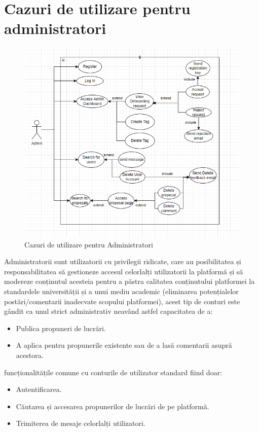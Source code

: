 \documentclass[12pt,a4paper,hidelinks]{report}
\theoremstyle{definition}
\theoremstyle{remark}
\begin{document}
\section{Cazuri de utilizare pentru administratori}
\begin{figure}[H]
    \centering
    \includegraphics[scale=0.5]{images/AdminUserUseCase.png}
    \caption{Cazuri de utilizare pentru Administratori}
    \label{fig:adminUseCaseDiagram}
\end{figure}
Administratorii sunt utilizatorii cu privilegii ridicate, care au posibilitatea și responsabilitatea să gestioneze accesul celorlalți utilizatorii la platformă și să modereze conținutul acesteia pentru a păstra calitatea conținutului platformei la standardele universității și a unui mediu academic (eliminarea potențialelor postări/comentarii inadecvate scopului platformei), acest tip de conturi este gândit ca unul strict administrativ neavând astfel capacitatea de a:
\begin{itemize}
    \item Publica propuneri de lucrări.
    \item A aplica pentru propunerile existente sau de a lasă comentarii asupră acestora.
\end{itemize}
funcționalitățile comune cu conturile de utilizator standard fiind doar:
\begin{itemize}
    \item Autentificarea.
    \item Căutarea și accesarea  propunerilor de lucrări de pe platformă.
    \item Trimiterea de mesaje celorlalți utilizatori.
\end{itemize}
\end{document}
